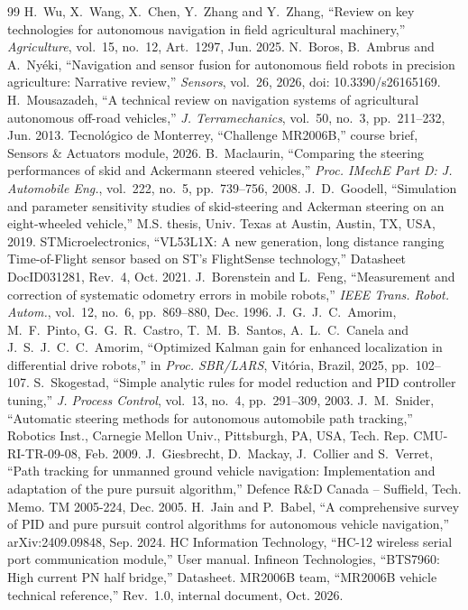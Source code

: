 \documentclass[conference]{IEEEtran}\newcommand{\haveieee}{}%
\newcommand{\refsize}{\footnotesize}
\begin{document}
\balance
{\refsize
\begin{thebibliography}{99}
 H.~Wu, X.~Wang, X.~Chen, Y.~Zhang and Y.~Zhang, ``Review on key technologies for autonomous navigation in field agricultural machinery,'' \emph{Agriculture}, vol.~15, no.~12, Art.~1297, Jun. 2025.
 N.~Boros, B.~Ambrus and A.~Ny\'eki, ``Navigation and sensor fusion for autonomous field robots in precision agriculture: Narrative review,'' \emph{Sensors}, vol.~26, 2026, doi: 10.3390/s26165169.
 H.~Mousazadeh, ``A technical review on navigation systems of agricultural autonomous off-road vehicles,'' \emph{J. Terramechanics}, vol.~50, no.~3, pp.~211--232, Jun. 2013.
 Tecnol\'ogico de Monterrey, ``Challenge MR2006B,'' course brief, Sensors \& Actuators module, 2026.
 B.~Maclaurin, ``Comparing the steering performances of skid and Ackermann steered vehicles,'' \emph{Proc. IMechE Part D: J. Automobile Eng.}, vol.~222, no.~5, pp.~739--756, 2008.
 J.~D.~Goodell, ``Simulation and parameter sensitivity studies of skid-steering and Ackerman steering on an eight-wheeled vehicle,'' M.S. thesis, Univ. Texas at Austin, Austin, TX, USA, 2019.
 STMicroelectronics, ``VL53L1X: A new generation, long distance ranging Time-of-Flight sensor based on ST's FlightSense technology,'' Datasheet DocID031281, Rev.~4, Oct. 2021.
 J.~Borenstein and L.~Feng, ``Measurement and correction of systematic odometry errors in mobile robots,'' \emph{IEEE Trans. Robot. Autom.}, vol.~12, no.~6, pp.~869--880, Dec. 1996.
 J.~G.~J.~C.~Amorim, M.~F.~Pinto, G.~G.~R.~Castro, T.~M.~B.~Santos, A.~L.~C.~Canela and J.~S.~J.~C.~C.~Amorim, ``Optimized Kalman gain for enhanced localization in differential drive robots,'' in \emph{Proc. SBR/LARS}, Vit\'oria, Brazil, 2025, pp.~102--107.
 S.~Skogestad, ``Simple analytic rules for model reduction and PID controller tuning,'' \emph{J. Process Control}, vol.~13, no.~4, pp.~291--309, 2003.
 J.~M.~Snider, ``Automatic steering methods for autonomous automobile path tracking,'' Robotics Inst., Carnegie Mellon Univ., Pittsburgh, PA, USA, Tech. Rep. CMU-RI-TR-09-08, Feb. 2009.
 J.~Giesbrecht, D.~Mackay, J.~Collier and S.~Verret, ``Path tracking for unmanned ground vehicle navigation: Implementation and adaptation of the pure pursuit algorithm,'' Defence R\&D Canada -- Suffield, Tech. Memo. TM 2005-224, Dec. 2005.
 H.~Jain and P.~Babel, ``A comprehensive survey of PID and pure pursuit control algorithms for autonomous vehicle navigation,'' arXiv:2409.09848, Sep. 2024.
 HC Information Technology, ``HC-12 wireless serial port communication module,'' User manual.
 Infineon Technologies, ``BTS7960: High current PN half bridge,'' Datasheet.
 MR2006B team, ``MR2006B vehicle technical reference,'' Rev.~1.0, internal document, Oct. 2026.
\end{thebibliography}}
\end{document}
